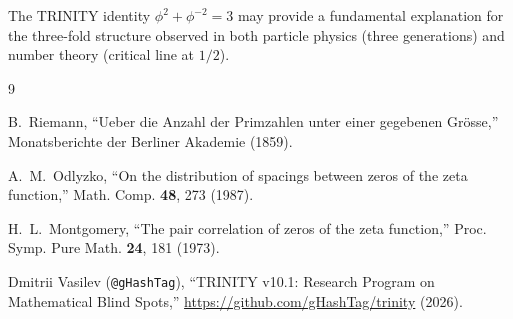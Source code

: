 \documentclass[12pt,a4paper]{article}
\begin{document}
The TRINITY identity $\phi^2 + \phi^{-2} = 3$ may provide a fundamental explanation for the three-fold structure observed in both particle physics (three generations) and number theory (critical line at $1/2$).

\begin{thebibliography}{9}

B.~Riemann,
``Ueber die Anzahl der Primzahlen unter einer gegebenen Grösse,''
Monatsberichte der Berliner Akademie (1859).

A.~M.~Odlyzko,
``On the distribution of spacings between zeros of the zeta function,''
Math. Comp. \textbf{48}, 273 (1987).

H.~L.~Montgomery,
``The pair correlation of zeros of the zeta function,''
Proc. Symp. Pure Math. \textbf{24}, 181 (1973).

Dmitrii Vasilev (\texttt{@gHashTag}),
``TRINITY v10.1: Research Program on Mathematical Blind Spots,''
\url{https://github.com/gHashTag/trinity} (2026).

\end{thebibliography}
\end{document}
